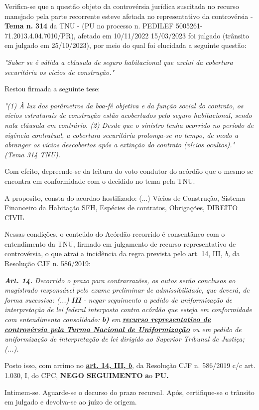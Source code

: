 \documentclass[12pt]{article}
\begin{document}
\justifying
\noindent Verifica-se que a questão objeto da controvérsia jurídica suscitada no recurso manejado pela parte recorrente esteve afetada no representativo da controvérsia - \textbf{Tema n. }\textbf{314} da TNU - (PU no processo n. PEDILEF 5005261-71.2013.4.04.7010/PR),  afetado em 10/11/2022 15/03/2023 foi julgado (trânsito em julgado em 25/10/2023), por meio do qual foi elucidada a seguinte questão:

\noindent \textit{"Saber se é válida a cláusula de seguro habitacional que exclui da cobertura securitária os vícios de construção."}

\noindent Restou firmada a seguinte tese:

\noindent \textit{"(1) À luz dos parâmetros da boa-fé objetiva e da função social do contrato, os vícios estruturais de construção estão acobertados pelo seguro habitacional, sendo nula cláusula em contrário. (2) Desde que o sinistro tenha ocorrido no período de vigência contratual, a cobertura securitária prolonga-se no tempo, de modo a abranger os vícios descobertos após a extinção do contrato (vícios ocultos)." (Tema 314 TNU).}

\noindent Com efeito, depreende-se da leitura do voto condutor do acórdão que o mesmo se encontra em conformidade com o decidido no  tema pela TNU.

\noindent A proposito, consta do acordao hostilizado: (...) Vícios de Construção, Sistema Financeiro da Habitação SFH, Espécies de contratos, Obrigações, DIREITO CIVIL

\noindent Nessas condições, o conteúdo do Acórdão recorrido é consentâneo com o entendimento da TNU, firmado em julgamento de recurso representativo de controvérsia, o que atrai a incidência da regra prevista pelo art. 14, III, \textit{b,} da Resolução CJF n. 586/2019:

\noindent \textit{\textbf{Art. 14.}}\textit{ Decorrido o prazo para contrarrazões, os autos serão conclusos ao magistrado responsável pelo exame preliminar de admissibilidade, que deverá, de forma sucessiva: (...) }\textit{\textbf{III }}\textit{- negar seguimento a pedido de uniformização de interpretação de lei federal interposto contra acórdão que esteja em conformidade com entendimento consolidado: }\textit{\textbf{b)}}\textit{ em }\uline{\textit{\textbf{recurso representativo de controvérsia pela Turma Nacional de Uniformização}}}\textit{ ou em pedido de uniformização de interpretação de lei dirigido ao Superior Tribunal de Justiça;(...).}

\noindent Posto isso, com arrimo no \uline{\textbf{art. 14, III, }}\uline{\textit{\textbf{b}}}\textit{,} da Resolução CJF n. 586/2019 c/c art. 1.030, I, do CPC, \textbf{NEGO SEGUIMENTO }\textbf{a}o\textbf{ PU}\textbf{.}

\noindent Intimem-se. Aguarde-se o decurso do prazo recursal. Após, certifique-se o trânsito em julgado e devolva-se ao juízo de origem.
\end{document}
